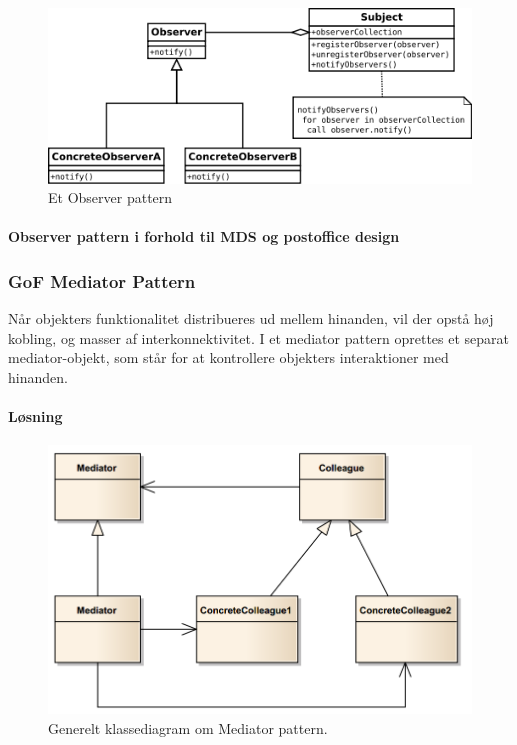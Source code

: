 \begin{figure}[h]
	\centering
	\includegraphics[width=0.8\linewidth]{figs/spm5/observerUML}
	\caption{Et Observer pattern}
	\label{fig:ObserverPattern}
\end{figure}

\paragraph{Observer pattern i forhold til MDS og postoffice design}

\subsubsection{GoF Mediator Pattern}
Når objekters funktionalitet distribueres ud mellem hinanden, vil der opstå høj kobling, og masser af interkonnektivitet.  I et mediator pattern oprettes et separat mediator-objekt, som står for at kontrollere objekters interaktioner med hinanden. 

\paragraph{Løsning}

\begin{figure}[h]
	\centering
	\includegraphics[width=0.8\linewidth]{figs/spm5/concrete}
	\caption{Generelt klassediagram om Mediator pattern.}
	\label{fig:concrete}
\end{figure}

